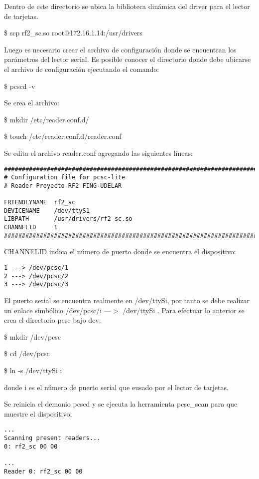 Dentro de este directorio se ubica la biblioteca dinámica del driver para el lector de tarjetas. 

\bigskip	 
\centerline{\$ scp rf2\_sc.so root@172.16.1.14:/usr/drivers}

\bigskip
Luego es necesario crear el archivo de configuración donde se encuentran los parámetros del lector serial. Es posible conocer el directorio donde debe ubicarse el archivo de configuración ejecutando el comando: 

\bigskip
\centerline{\$ pcscd -v}

\bigskip
Se crea el archivo: 

\bigskip
\$ mkdir /etc/reader.conf.d/ 

\$ touch /etc/reader.conf.d/reader.conf 

\bigskip
Se edita el archivo reader.conf agregando las siguientes líneas: 

\begin{verbatim}
####################################################################### 
# Configuration file for pcsc-lite 
# Reader Proyecto-RF2 FING-UDELAR 

FRIENDLYNAME  rf2_sc 
DEVICENAME    /dev/ttyS1 
LIBPATH       /usr/drivers/rf2_sc.so 
CHANNELID     1 
####################################################################### 
\end{verbatim}

CHANNELID indica el número de puerto donde se encuentra el dispositivo: 

\begin{verbatim}
1 ---> /dev/pcsc/1 
2 ---> /dev/pcsc/2 
3 ---> /dev/pcsc/3 
\end{verbatim}

El puerto serial se encuentra realmente en /dev/ttySi, por tanto se debe realizar un enlace simbólico /dev/pcsc/i ---$>$ /dev/ttySi . Para efectuar lo anterior se crea el directorio pcsc bajo dev: 

\bigskip
\centerline{\$ mkdir /dev/pcsc}

\centerline{\$ cd /dev/pcsc}

\centerline{\$ ln -s /dev/ttySi i}

donde i es el número de puerto serial que eusado por el lector de tarjetas. 

\bigskip
Se reinicia el demonio pcscd y se ejecuta la herramienta pcsc\_scan para que muestre el dispositivo: 

\begin{verbatim}
...	
Scanning present readers... 
0: rf2_sc 00 00 

... 
Reader 0: rf2_sc 00 00 
\end{verbatim}


